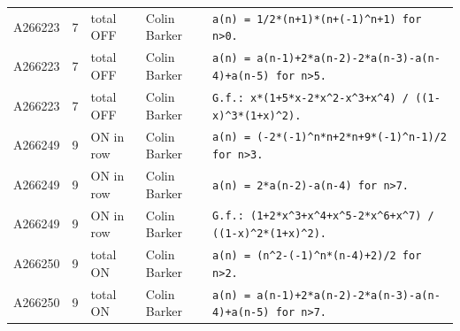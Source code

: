 \documentclass[11pt]{article}
\theoremstyle{definition}
\theoremstyle{remark}
\begin{document}
{\begin{longtable}{p{1.3cm}p{0.7cm}p{2.4cm}p{2.3cm}p{7.3cm}}
A266223 & 7 & total OFF & Colin Barker & \texttt{a(n)\allowbreak{} \allowbreak{}=\allowbreak{} \allowbreak{}1/\allowbreak{}2*\allowbreak{}(n+\allowbreak{}1)\allowbreak{}*\allowbreak{}(n+\allowbreak{}(-\allowbreak{}1)\allowbreak{}\^{}n+\allowbreak{}1)\allowbreak{} \allowbreak{}for \allowbreak{}n>0.} \\
A266223 & 7 & total OFF & Colin Barker & \texttt{a(n)\allowbreak{} \allowbreak{}=\allowbreak{} \allowbreak{}a(n-\allowbreak{}1)\allowbreak{}+\allowbreak{}2*\allowbreak{}a(n-\allowbreak{}2)\allowbreak{}-\allowbreak{}2*\allowbreak{}a(n-\allowbreak{}3)\allowbreak{}-\allowbreak{}a(n-\allowbreak{}4)\allowbreak{}+\allowbreak{}a(n-\allowbreak{}5)\allowbreak{} \allowbreak{}for \allowbreak{}n>5.} \\
A266223 & 7 & total OFF & Colin Barker & \texttt{G.f.: \allowbreak{}x*\allowbreak{}(1+\allowbreak{}5*\allowbreak{}x-\allowbreak{}2*\allowbreak{}x\^{}2-\allowbreak{}x\^{}3+\allowbreak{}x\^{}4)\allowbreak{} \allowbreak{}/\allowbreak{} \allowbreak{}((1-\allowbreak{}x)\allowbreak{}\^{}3*\allowbreak{}(1+\allowbreak{}x)\allowbreak{}\^{}2)\allowbreak{}.} \\
A266249 & 9 & ON in row & Colin Barker & \texttt{a(n)\allowbreak{} \allowbreak{}=\allowbreak{} \allowbreak{}(-\allowbreak{}2*\allowbreak{}(-\allowbreak{}1)\allowbreak{}\^{}n*\allowbreak{}n+\allowbreak{}2*\allowbreak{}n+\allowbreak{}9*\allowbreak{}(-\allowbreak{}1)\allowbreak{}\^{}n-\allowbreak{}1)\allowbreak{}/\allowbreak{}2 \allowbreak{}for \allowbreak{}n>3.} \\
A266249 & 9 & ON in row & Colin Barker & \texttt{a(n)\allowbreak{} \allowbreak{}=\allowbreak{} \allowbreak{}2*\allowbreak{}a(n-\allowbreak{}2)\allowbreak{}-\allowbreak{}a(n-\allowbreak{}4)\allowbreak{} \allowbreak{}for \allowbreak{}n>7.} \\
A266249 & 9 & ON in row & Colin Barker & \texttt{G.f.: \allowbreak{}(1+\allowbreak{}2*\allowbreak{}x\^{}3+\allowbreak{}x\^{}4+\allowbreak{}x\^{}5-\allowbreak{}2*\allowbreak{}x\^{}6+\allowbreak{}x\^{}7)\allowbreak{} \allowbreak{}/\allowbreak{} \allowbreak{}((1-\allowbreak{}x)\allowbreak{}\^{}2*\allowbreak{}(1+\allowbreak{}x)\allowbreak{}\^{}2)\allowbreak{}.} \\
A266250 & 9 & total ON & Colin Barker & \texttt{a(n)\allowbreak{} \allowbreak{}=\allowbreak{} \allowbreak{}(n\^{}2-\allowbreak{}(-\allowbreak{}1)\allowbreak{}\^{}n*\allowbreak{}(n-\allowbreak{}4)\allowbreak{}+\allowbreak{}2)\allowbreak{}/\allowbreak{}2 \allowbreak{}for \allowbreak{}n>2.} \\
A266250 & 9 & total ON & Colin Barker & \texttt{a(n)\allowbreak{} \allowbreak{}=\allowbreak{} \allowbreak{}a(n-\allowbreak{}1)\allowbreak{}+\allowbreak{}2*\allowbreak{}a(n-\allowbreak{}2)\allowbreak{}-\allowbreak{}2*\allowbreak{}a(n-\allowbreak{}3)\allowbreak{}-\allowbreak{}a(n-\allowbreak{}4)\allowbreak{}+\allowbreak{}a(n-\allowbreak{}5)\allowbreak{} \allowbreak{}for \allowbreak{}n>7.} \\

\end{longtable}}
\end{document}
